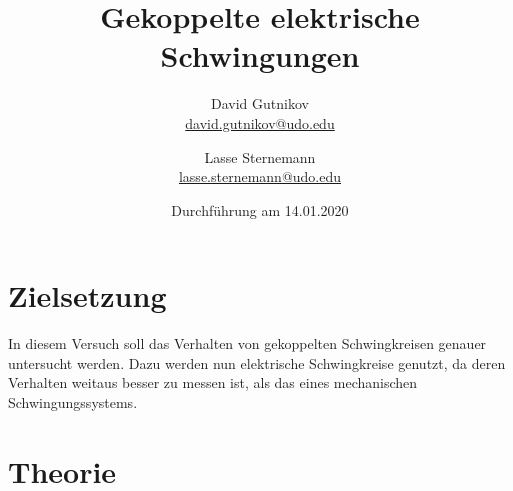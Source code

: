 \documentclass[titlepage = firstcover]{scrartcl}
\title{Gekoppelte elektrische Schwingungen}
\author{
  David Gutnikov\\
  \href{mailto:david.gutnikov@udo.edu}{david.gutnikov@udo.edu}
 \and 
  Lasse Sternemann\\
  \href{mailto:lasse.sternemann@udo.edu}{lasse.sternemann@udo.edu}
}
\date{Durchführung am 14.01.2020}
\begin{document}
  \maketitle
  \newpage
  \tableofcontents
  \newpage


\section{Zielsetzung}
    In diesem Versuch soll das Verhalten von gekoppelten Schwingkreisen genauer untersucht werden. Dazu werden nun elektrische Schwingkreise genutzt, da 
    deren Verhalten weitaus besser zu messen ist, als das eines mechanischen Schwingungssystems.
    
\section{Theorie}   
\end{document}
